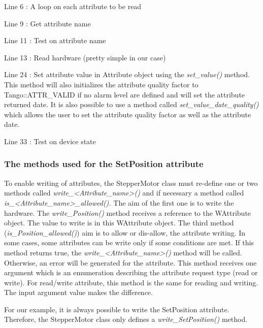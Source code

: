 Line 6 : A loop on each attribute to be read

Line 9 : Get attribute name

Line 11 : Test on attribute name

Line 13 : Read hardware (pretty simple in our case)

Line 24 : Set attribute value in Attribute object using the \emph{set\_value()}
method. This method will also initializes the attribute quality factor
to Tango::ATTR\_VALID if no alarm level are defined
and will set the attribute returned date. It is also possible to use
a method called \emph{set\_value\_date\_quality()}
which allows the user to set the attribute quality factor as well
as the attribute date.

Line 33 : Test on device state

\subsubsection{The methods used for the SetPosition attribute}

To enable writing of attributes, the StepperMotor
class must re-define one or two methods called \emph{write\_<Attribute\_name>()}
and if necessary a method called \emph{is\_<Attribute\_name>\_allowed().}
The aim of the first one is to write the hardware. The \emph{write\_Position()}
method receives a reference to the WAttribute object. The value to
write is in this WAttribute object. The third method (\emph{is\_Position\_allowed()})
aim is to allow or dis-allow, the attribute writing. In some cases,
some attributes can be write only if some conditions are met. If this
method returns true, the \emph{write\_<Attribute\_name>()} method
will be called. Otherwise, an error will be generated for the attribute.
This method receives one argument which is an emumeration describing
the attribute request type (read or write). For read/write attribute,
this method is the same for reading and writing. The input argument
value makes the difference.

For our example, it is always possible to write the SetPosition attribute.
Therefore, the StepperMotor class only defines a \emph{write\_SetPosition()}
method.

